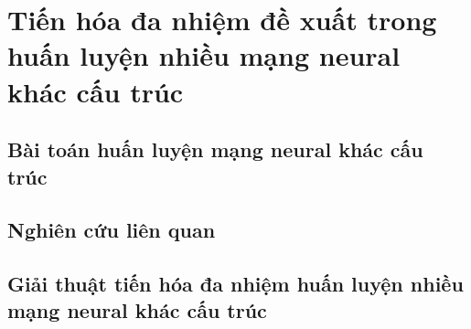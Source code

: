 \chapter{Tiến hóa đa nhiệm đề xuất trong huấn luyện nhiều mạng neural khác cấu trúc}
\label{chap:problem}
\section{Bài toán huấn luyện mạng neural khác cấu trúc}

\section{Nghiên cứu liên quan}

\section{Giải thuật tiến hóa đa nhiệm huấn luyện nhiều mạng neural khác cấu trúc}


